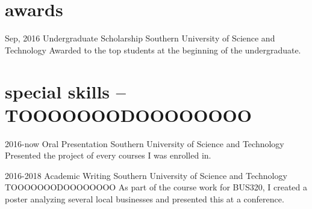 \documentclass[]{friggeri-cv-a4}
\begin{document}

\section{awards}

\begin{entrylist}


\entry
{Sep, 2016}
{Undergraduate Scholarship}
{Southern University of Science and Technology}
{Awarded to the top students at the beginning of the undergraduate.}


\end{entrylist}


\section{special skills -- TOOOOOOODOOOOOOOO}

\begin{entrylist}


\entry
{2016-now}
{Oral Presentation}
{Southern University of Science and Technology}
{Presented the project of every courses I was enrolled in.}


\entry
{2016-2018}
{Academic Writing}
{Southern University of Science and Technology}
{TOOOOOOODOOOOOOOO As part of the course work for BUS320, I created a poster analyzing several local businesses and presented this at a conference.}


\end{entrylist}

\end{document}
